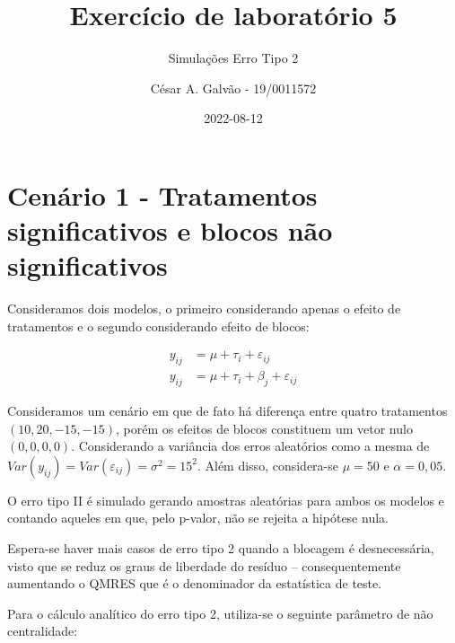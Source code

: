 \documentclass[
]{article}
\title{Exercício de laboratório 5}
\subtitle{Simulações Erro Tipo 2}
\author{César A. Galvão - 19/0011572}
\date{2022-08-12}
\begin{document}
\maketitle

\newpage{}

{
\setcounter{tocdepth}{2}
\tableofcontents
}
\let\oldsection\section
\renewcommand\section{\clearpage\oldsection}

\hypertarget{cenuxe1rio-1---tratamentos-significativos-e-blocos-nuxe3o-significativos}{%
\section{Cenário 1 - Tratamentos significativos e blocos não
significativos}\label{cenuxe1rio-1---tratamentos-significativos-e-blocos-nuxe3o-significativos}}

Consideramos dois modelos, o primeiro considerando apenas o efeito de
tratamentos e o segundo considerando efeito de blocos:

\begin{align}
  y_{ij} &= \mu + \tau_i + \varepsilon_{ij} \label{51}\\
  y_{ij} &= \mu + \tau_i + \beta_j + \varepsilon_{ij} \label{52}
\end{align}

Consideramos um cenário em que de fato há diferença entre quatro
tratamentos \((10, 20, -15, -15)\), porém os efeitos de blocos
constituem um vetor nulo \((0, 0, 0, 0)\). Considerando a variância dos
erros aleatórios como a mesma de
\(Var(y_{ij}) = Var(\varepsilon_{ij}) = \sigma^2 = 15^2\). Além disso,
considera-se \(\mu = 50\) e \(\alpha = 0,05\).

O erro tipo II é simulado gerando amostras aleatórias para ambos os
modelos e contando aqueles em que, pelo p-valor, não se rejeita a
hipótese nula.

Espera-se haver mais casos de erro tipo 2 quando a blocagem é
desnecessária, visto que se reduz os graus de liberdade do resíduo --
consequentemente aumentando o QMRES que é o denominador da estatística
de teste.

Para o cálculo analítico do erro tipo 2, utiliza-se o seguinte parâmetro
de não centralidade:
\end{document}
